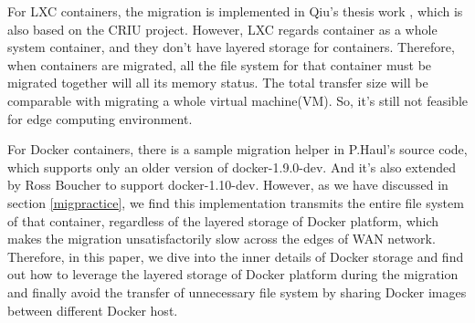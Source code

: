 For LXC containers, the migration is implemented in Qiu's thesis work \cite{qiu2016evaluating}, which is also based on the CRIU project. However, LXC regards container as a whole system container, and they don't have layered storage for containers. Therefore, when containers are migrated, all the file system for that container must be migrated together will all its memory status. The total transfer size will be comparable with migrating a whole virtual machine(VM). So, it's still not feasible for edge computing environment. 

For Docker containers, there is a sample migration helper in P.Haul's source code, which supports only an older version of docker-1.9.0-dev. And it's also extended by Ross Boucher to support docker-1.10-dev. However, as we have discussed in section \ref{migpractice}, we find this implementation transmits the entire file system of that container, regardless of the layered storage of Docker platform, which makes the migration unsatisfactorily slow across the edges of WAN network. Therefore, in this paper, we dive into the inner details of Docker storage and find out how to leverage the layered storage of Docker platform during the migration and finally avoid the transfer of unnecessary file system by sharing Docker images between different Docker host. 


